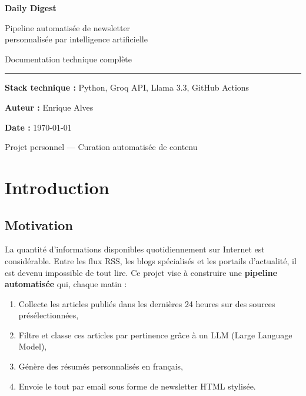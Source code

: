 \documentclass[11pt, a4paper]{article}
\begin{document}
\begin{titlepage}
    \centering
    \vspace*{3cm}
    {\Huge\bfseries Daily Digest\par}
    \vspace{0.5cm}
    {\Large Pipeline automatisée de newsletter\\personnalisée par intelligence artificielle\par}
    \vspace{2cm}
    {\large Documentation technique complète\par}
    \vspace{1cm}
    \rule{0.6\textwidth}{0.4pt}\par
    \vspace{1cm}
    {\large
    \textbf{Stack technique :} Python, Groq API, Llama 3.3, GitHub Actions\par
    \vspace{0.5cm}
    \textbf{Auteur :} Enrique Alves\par
    \vspace{0.5cm}
    \textbf{Date :} \today\par
    }
    \vfill
    {\small Projet personnel --- Curation automatisée de contenu}
\end{titlepage}

\tableofcontents
\newpage

\section{Introduction}

\subsection{Motivation}

La quantité d'informations disponibles quotidiennement sur Internet est considérable. Entre les flux RSS, les blogs spécialisés et les portails d'actualité, il est devenu impossible de tout lire. Ce projet vise à construire une \textbf{pipeline automatisée} qui, chaque matin :

\begin{enumerate}
    \item Collecte les articles publiés dans les dernières 24 heures sur des sources présélectionnées,
    \item Filtre et classe ces articles par pertinence grâce à un LLM (Large Language Model),
    \item Génère des résumés personnalisés en français,
    \item Envoie le tout par email sous forme de newsletter HTML stylisée.
\end{enumerate}
\end{document}
